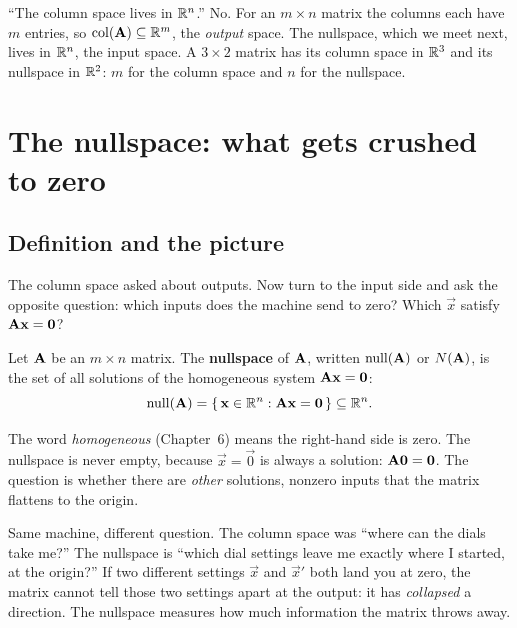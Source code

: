 \begin{trapbox}
``The column space lives in $\mathbb{R}^n$.'' No. For
an $m\times n$ matrix the columns each have $m$ entries, so $\operatorname{col}(\mathbf{A})
\subseteq \mathbb{R}^m$, the \emph{output} space. The nullspace, which we meet next,
lives in $\mathbb{R}^n$, the input space. A $3\times2$ matrix has its column space in
$\mathbb{R}^3$ and its nullspace in $\mathbb{R}^2$: $m$ for the column
space and $n$ for the nullspace.
\end{trapbox}

\section{The nullspace: what gets crushed to zero}

\subsection{Definition and the picture}

The column space asked about outputs. Now turn to the input side and ask
the opposite question: which inputs does the machine send to zero? Which $\vec{x}$
satisfy $\mathbf{A}\mathbf{x}=\mathbf{0}$?

\begin{definition}[Nullspace]\label{ch12:nullspace-def}
Let $\mathbf{A}$ be an $m\times n$ matrix. The \textbf{nullspace} of $\mathbf{A}$,
written $\operatorname{null}(\mathbf{A})$ or $N(\mathbf{A})$, is the set of all solutions of the
homogeneous system $\mathbf{A}\mathbf{x}=\mathbf{0}$:
\[
  \operatorname{null}(\mathbf{A}) = \{\,\mathbf{x}\in\mathbb{R}^n : \mathbf{A}\mathbf{x}=\mathbf{0}\,\} \subseteq \mathbb{R}^n.
\]
\end{definition}

The word \emph{homogeneous} (Chapter~6) means the right-hand side is zero. The
nullspace is never empty, because $\vec{x}=\vec{0}$ is always a solution:
$\mathbf{A}\mathbf{0}=\mathbf{0}$. The question is whether there are \emph{other}
solutions, nonzero inputs that the matrix flattens to the origin.

\begin{intuitionbox}
Same machine, different question. The column space was ``where can the dials take
me?'' The nullspace is ``which dial settings leave me exactly where I started, at
the origin?'' If two different settings $\vec{x}$ and $\vec{x}'$ both land you at
zero, the matrix cannot tell those two settings apart at the output: it has
\emph{collapsed} a direction. The nullspace measures how much information the
matrix throws away.
\end{intuitionbox}

